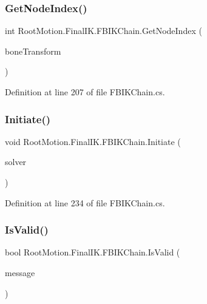 \subsubsection{\texorpdfstring{Get\+Node\+Index()}{GetNodeIndex()}}
{\footnotesize\ttfamily int Root\+Motion.\+Final\+I\+K.\+F\+B\+I\+K\+Chain.\+Get\+Node\+Index (\begin{DoxyParamCaption}\item[{Transform}]{bone\+Transform }\end{DoxyParamCaption})}



Definition at line 207 of file F\+B\+I\+K\+Chain.\+cs.

\mbox{\label{class_root_motion_1_1_final_i_k_1_1_f_b_i_k_chain_a920f4ea3e2aa7ca61a6e87aa1e01de9a}} 
\subsubsection{\texorpdfstring{Initiate()}{Initiate()}}
{\footnotesize\ttfamily void Root\+Motion.\+Final\+I\+K.\+F\+B\+I\+K\+Chain.\+Initiate (\begin{DoxyParamCaption}\item[{\mbox{\hyperlink{class_root_motion_1_1_final_i_k_1_1_i_k_solver_full_body}{I\+K\+Solver\+Full\+Body}}}]{solver }\end{DoxyParamCaption})}



Definition at line 234 of file F\+B\+I\+K\+Chain.\+cs.

\mbox{\label{class_root_motion_1_1_final_i_k_1_1_f_b_i_k_chain_a29b16757a3f6914b742a0d3561529d24}} 
\subsubsection{\texorpdfstring{Is\+Valid()}{IsValid()}}
{\footnotesize\ttfamily bool Root\+Motion.\+Final\+I\+K.\+F\+B\+I\+K\+Chain.\+Is\+Valid (\begin{DoxyParamCaption}\item[{ref string}]{message }\end{DoxyParamCaption})}



